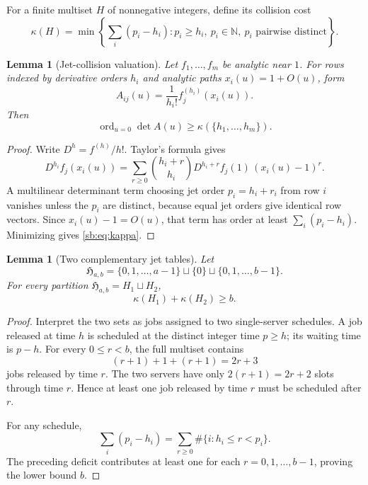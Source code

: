 \documentclass[11pt]{article}
\newtheorem{lemma}[theorem]{Lemma}
\theoremstyle{definition}
\theoremstyle{remark}
\newcommand{\N}{\mathbb N}
\newcommand{\ord}{\operatorname{ord}}
\theoremstyle{definition}
\theoremstyle{plain}
\numberwithin{equation}{section}
\begin{document}
For a finite multiset $H$ of nonnegative integers, define its collision cost
\begin{equation}
 \kappa(H)=\min\left\{
 \sum_i(p_i-h_i):
 p_i\ge h_i,\ p_i\in\N,\ p_i\text{ pairwise distinct}
 \right\}.
 \label{sb:eq:kappa}
\end{equation}

\begin{lemma}[Jet-collision valuation]
\label{sb:lem:jet-collision}
Let $f_1,\ldots,f_m$ be analytic near $1$.  For rows indexed by derivative
orders $h_i$ and analytic paths $x_i(u)=1+O(u)$, form
\[
 A_{ij}(u)=\frac{1}{h_i!}f_j^{(h_i)}(x_i(u)).
\]
Then
\[
 \ord_{u=0}\det A(u)\ge\kappa(\{h_1,\ldots,h_m\}).
\]
\end{lemma}

\begin{proof}
Write $D^h=f^{(h)}/h!$.  Taylor's formula gives
\begin{equation}
 D^{h_i}f_j(x_i(u))
 =\sum_{r\ge0}\binom{h_i+r}{h_i}
 D^{h_i+r}f_j(1)\,(x_i(u)-1)^r.
 \label{sb:eq:jet-taylor}
\end{equation}
A multilinear determinant term choosing jet order $p_i=h_i+r_i$ from row
$i$ vanishes unless the $p_i$ are distinct, because equal jet orders give
identical row vectors.  Since $x_i(u)-1=O(u)$, that term has order at least
$\sum_i(p_i-h_i)$.  Minimizing gives \eqref{sb:eq:kappa}.
\end{proof}

\begin{lemma}[Two complementary jet tables]
\label{sb:lem:two-server}
Let
\begin{equation}
 \mathfrak H_{a,b}
 =\{0,1,\ldots,a-1\}\sqcup\{0\}\sqcup\{0,1,\ldots,b-1\}.
 \label{sb:eq:full-derivative-multiset}
\end{equation}
For every partition $\mathfrak H_{a,b}=H_1\sqcup H_2$,
\[
 \kappa(H_1)+\kappa(H_2)\ge b.
\]
\end{lemma}

\begin{proof}
Interpret the two sets as jobs assigned to two single-server schedules.  A
job released at time $h$ is scheduled at the distinct integer time $p\ge h$;
its waiting time is $p-h$.  For every $0\le r<b$, the full multiset contains
\[
 (r+1)+1+(r+1)=2r+3
\]
jobs released by time $r$.  The two servers have only $2(r+1)=2r+2$ slots
through time $r$.  Hence at least one job released by time $r$ must be
scheduled after $r$.

For any schedule,
\[
 \sum_i(p_i-h_i)=
 \sum_{r\ge0}\#\{i:h_i\le r<p_i\}.
\]
The preceding deficit contributes at least one for each
$r=0,1,\ldots,b-1$, proving the lower bound $b$.
\end{proof}
\end{document}
